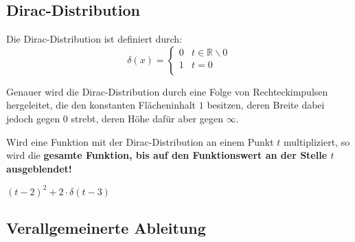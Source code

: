\documentclass[12pt, a4paper]{scrartcl}
\begin{document}
\subsection{Dirac-Distribution}
\begin{minipage}{.5\textwidth}
  Die Dirac-Distribution ist definiert durch:
  \[
    \delta(x)=
    \begin{cases}
      0 & t \in \mathbb{R} \backslash 0\\
      1 & t = 0\\
    \end{cases}
  \]
\end{minipage}\hfill%
\begin{minipage}{.5\textwidth}
  \centering
\end{minipage}

Genauer wird die Dirac-Distribution durch eine Folge von Rechteckimpulsen hergeleitet, die den konstanten Flächeninhalt \(1\) besitzen, deren Breite dabei jedoch gegen \(0\) strebt, deren Höhe dafür aber gegen \(\infty\).

\begin{minipage}{.5\textwidth}
  Wird eine Funktion mit der Dirac-Distribution an einem Punkt \(t\) multipliziert, so wird die \textbf{gesamte Funktion, bis auf den Funktionswert an der Stelle \(t\) ausgeblendet!}
\end{minipage}\hfill%
\begin{minipage}{.5\textwidth}
  \centering
  {\footnotesize \((t-2)^2+2 \cdot \delta(t-3)\)}
\end{minipage}

\subsection{Verallgemeinerte Ableitung}
\end{document}
